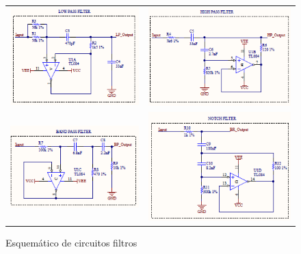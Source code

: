 \begin{figure}[H]
    \centering
    \begin{tabular}{c c}
        \includegraphics[scale=1]{../EJ2/Recursos/esquematico_low_pass.PNG} &
        \includegraphics[scale=1]{../EJ2/Recursos/esquematico_high_pass.PNG} \\
        \includegraphics[scale=1]{../EJ2/Recursos/esquematico_band_pass.PNG} &
        \includegraphics[scale=1]{../EJ2/Recursos/esquematico_notch.PNG} 
    \end{tabular}
    \caption{Esquem\'atico de circuitos filtros}
    \label{fig:esquematico_filtros}
\end{figure}


